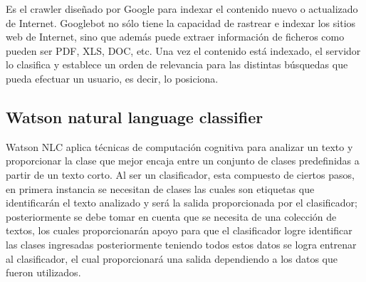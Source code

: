Es el crawler diseñado por Google para indexar el contenido nuevo o actualizado de Internet.
Googlebot \citep{CD13} no sólo tiene la capacidad de rastrear e indexar los sitios web de Internet, sino que además puede extraer información de ficheros como pueden ser PDF, XLS, DOC, etc.
Una vez el contenido está indexado, el servidor lo clasifica y establece un orden de relevancia para las distintas búsquedas que pueda efectuar un usuario, es decir, lo posiciona.\\



\begin{large}
	 \subsection{Watson natural language classifier}
\end{large}

Watson NLC \citep{CD14} aplica técnicas de computación cognitiva para analizar un texto y proporcionar la clase que mejor encaja entre un conjunto de clases predefinidas a partir de un texto corto.
Al ser un clasificador, esta compuesto de ciertos pasos, en primera instancia se necesitan de clases las cuales son etiquetas que identificarán el texto analizado y será la salida proporcionada por el clasificador; posteriormente se debe tomar en cuenta que se necesita de una colección de textos, los cuales proporcionarán apoyo para que el clasificador logre identificar las clases ingresadas posteriormente teniendo todos estos datos se logra entrenar al clasificador, el cual proporcionará una salida dependiendo a los datos que fueron utilizados.


